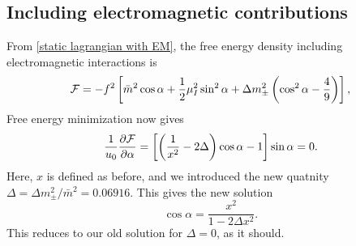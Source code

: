 \subsection{Including electromagnetic contributions}

From \autoref{static lagrangian with EM}, the free energy density including electromagnetic interactions is
%
\begin{equation}
    \mathcal{F} =
    - f^2 \left[
        \bar m^2 \cos \alpha 
        + \frac{1}{2} \mu_I^2 \sin^2 \alpha
        + \Delta m_\pm^2 \left(\cos^2 \alpha - \frac{4}{9}\right)
    \right],
\end{equation}
%
Free energy minimization now gives
%
\begin{equation}
    \frac{1}{u_0}\pdv{\mathcal{F}}{\alpha}
    = 
    \left[ \left( \frac{1}{x^2} - 2 \Delta \right) \cos \alpha - 1\right] \sin \alpha = 0.
\end{equation}
%
Here, $x$ is defined as before, and we introduced the new quatnity $\Delta = \Delta m_{\pm}^2 / \bar m^2= 0.06916 $.
This gives the new solution
%
\begin{equation}
    \cos \alpha = \frac{x^2}{1 - 2 \Delta x^2}.
\end{equation}
%
This reduces to our old solution for $\Delta = 0$, as it should.


